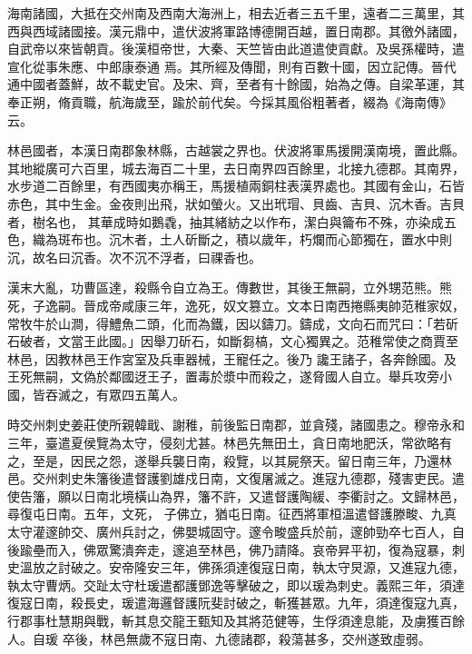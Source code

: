 
\begin{pinyinscope}

 海南諸國，大抵在交州南及西南大海洲上，相去近者三五千里，遠者二三萬里，其西與西域諸國接。漢元鼎中，遣伏波將軍路博德開百越，置日南郡。其徼外諸國，自武帝以來皆朝貢。後漢桓帝世，大秦、天竺皆由此道遣使貢獻。及吳孫權時，遣宣化從事朱應、中郎康泰通
 焉。其所經及傳聞，則有百數十國，因立記傳。晉代通中國者蓋鮮，故不載史官。及宋、齊，至者有十餘國，始為之傳。自梁革運，其奉正朔，脩貢職，航海歲至，踰於前代矣。今採其風俗粗著者，綴為《海南傳》云。



 林邑國者，本漢日南郡象林縣，古越裳之界也。伏波將軍馬援開漢南境，置此縣。其地縱廣可六百里，城去海百二十里，去日南界四百餘里，北接九德郡。其南界，水步道二百餘里，有西國夷亦稱王，馬援植兩銅柱表漢界處也。其國有金山，石皆赤色，其中生金。金夜則出飛，狀如螢火。又出玳瑁、貝齒、吉貝、沉木香。吉貝者，樹名也，
 其華成時如鵝毳，抽其緒紡之以作布，潔白與籥布不殊，亦染成五色，織為斑布也。沉木者，土人斫斷之，積以歲年，朽爛而心節獨在，置水中則沉，故名曰沉香。次不沉不浮者，曰祼香也。



 漢末大亂，功曹區達，殺縣令自立為王。傳數世，其後王無嗣，立外甥范熊。熊死，子逸嗣。晉成帝咸康三年，逸死，奴文篡立。文本日南西捲縣夷帥范稚家奴，常牧牛於山澗，得鱧魚二頭，化而為鐵，因以鑄刀。鑄成，文向石而咒曰：「若斫石破者，文當王此國。」因舉刀斫石，如斷芻槁，文心獨異之。范稚常使之商賈至林邑，因教林邑王作宮室及兵車器械，王寵任之。後乃
 讒王諸子，各奔餘國。及王死無嗣，文偽於鄰國迓王子，置毒於漿中而殺之，遂脅國人自立。舉兵攻旁小國，皆吞滅之，有眾四五萬人。



 時交州刺史姜莊使所親韓戢、謝稚，前後監日南郡，並貪殘，諸國患之。穆帝永和三年，臺遣夏侯覽為太守，侵刻尤甚。林邑先無田土，貪日南地肥沃，常欲略有之，至是，因民之怨，遂舉兵襲日南，殺覽，以其屍祭天。留日南三年，乃還林邑。交州刺史朱籓後遣督護劉雄戍日南，文復屠滅之。進寇九德郡，殘害吏民。遣使告籓，願以日南北境橫山為界，籓不許，又遣督護陶緩、李衢討之。文歸林邑，尋復屯日南。五年，文死，
 子佛立，猶屯日南。征西將軍桓溫遣督護滕畯、九真太守灌邃帥交、廣州兵討之，佛嬰城固守。邃令畯盛兵於前，邃帥勁卒七百人，自後踰壘而入，佛眾驚潰奔走，邃追至林邑，佛乃請降。哀帝昇平初，復為寇暴，刺史溫放之討破之。安帝隆安三年，佛孫須達復寇日南，執太守炅源，又進寇九德，執太守曹炳。交趾太守杜瑗遣都護鄧逸等擊破之，即以瑗為刺史。義熙三年，須達復寇日南，殺長史，瑗遣海邏督護阮斐討破之，斬獲甚眾。九年，須達復寇九真，行郡事杜慧期與戰，斬其息交龍王甄知及其將范健等，生俘須達息能，及虜獲百餘人。自瑗
 卒後，林邑無歲不寇日南、九德諸郡，殺蕩甚多，交州遂致虛弱。




\end{pinyinscope}
